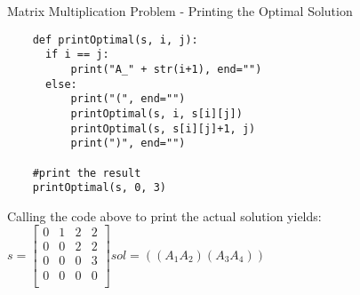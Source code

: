 \begin{frame}[fragile]{Matrix Multiplication Problem - Printing the Optimal Solution}
  \begin{lstlisting}
    def printOptimal(s, i, j):
      if i == j:
          print("A_" + str(i+1), end="")
      else:
          print("(", end="")
          printOptimal(s, i, s[i][j])
          printOptimal(s, s[i][j]+1, j)
          print(")", end="")

    #print the result
    printOptimal(s, 0, 3)
  \end{lstlisting}

  Calling the code above to print the actual solution yields: \\
  \vspace{0.1em}
  \pause 
  $ s = \begin{bmatrix}
      0 & 1 & 2 & 2 \\
      0 & 0 & 2  & 2 \\
      0 & 0 & 0 & 3 \\
      0 & 0 & 0 & 0 \\
    \end{bmatrix}
    sol = ((A_{1}A_{2})(A_{3}A_{4}))$
\end{frame}